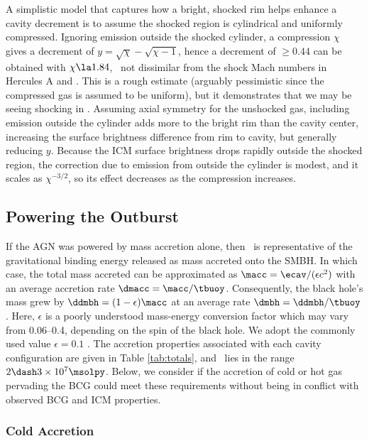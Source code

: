 \documentclass[11pt, preprint]{aastex}
\begin{document}
A simplistic model that captures how a bright, shocked rim helps
enhance a cavity decrement is to assume the shocked region is
cylindrical and uniformly compressed. Ignoring emission outside the
shocked cylinder, a compression $\chi$ gives a decrement of $y =
\sqrt{\chi} - \sqrt{\chi - 1}$, hence a decrement of $\ge 0.44$ can be
obtained with $\chi \la 1.84$, \ie\ not dissimilar from the shock Mach
numbers in Hercules A and \ms. This is a rough estimate (arguably
pessimistic since the compressed gas is assumed to be uniform), but it
demonstrates that we may be seeing shocking in \rbs. Assuming axial
symmetry for the unshocked gas, including emission outside the
cylinder adds more to the bright rim than the cavity center,
increasing the surface brightness difference from rim to cavity, but
generally reducing $y$. Because the ICM surface brightness drops
rapidly outside the shocked region, the correction due to emission
from outside the cylinder is modest, and it scales as $\chi^{-3/2}$,
so its effect decreases as the compression increases.

\subsection{Powering the Outburst}
\label{sec:accretion}

If the AGN was powered by mass accretion alone, then \ecav\ is
representative of the gravitational binding energy released as mass
accreted onto the SMBH. In which case, the total mass accreted can be
approximated as $\macc = \ecav/(\epsilon c^2)$ with an average
accretion rate $\dmacc = \macc/\tbuoy$. Consequently, the black hole's
mass grew by $\ddmbh = (1-\epsilon)\macc$ at an average rate $\dmbh =
\ddmbh/\tbuoy$. Here, $\epsilon$ is a poorly understood mass-energy
conversion factor which may vary from 0.06--0.4, depending on the spin
of the black hole. We adopt the commonly used value $\epsilon = 0.1$
\citep{2002apa..book.....F}. The accretion properties associated with
each cavity configuration are given in Table \ref{tab:totals}, and
\macc\ lies in the range $2 \dash 3 \times 10^7 \msolpy$. Below, we
consider if the accretion of cold or hot gas pervading the BCG could
meet these requirements without being in conflict with observed BCG
and ICM properties.

\subsubsection{Cold Accretion}
\label{sec:cold}
\end{document}
